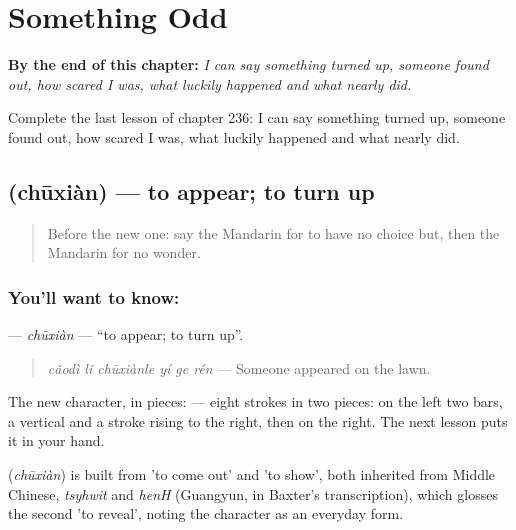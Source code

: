 
\chapter{Something Odd}
\label{ch:zh-something-odd}

\begin{chapteropening}
\textbf{By the end of this chapter:} \emph{I can say something turned up, someone found out, how scared I was, what luckily happened and what nearly did.}

Complete the last lesson of chapter 236: I can say something turned up, someone found out, how scared I was, what luckily happened and what nearly did.
\end{chapteropening}

\section[\texorpdfstring{\zh{出现} (chūxiàn)}{出现 (chūxiàn)}]{ (chūxiàn) — to appear; to turn up}

\label{lesson:ZH-C236-chuxian}



\begin{quote}
Before the new one: say the Mandarin for to have no choice but, then the Mandarin for no wonder.
\end{quote}

\subsection*{You'll want to know: }
\textbf{} — \emph{chūxiàn} — \textquotedblleft{}to appear; to turn up\textquotedblright{}.

\begin{quote}
\textbf{} \emph{cǎodì lǐ chūxiànle yí ge rén} — Someone appeared on the lawn.
\end{quote}

The new character, in pieces:  — eight strokes in two pieces: on the left two bars, a vertical and a stroke rising to the right, then  on the right. The next lesson puts it in your hand.

\begin{cousinweb}
\textbf{} (\emph{chūxiàn}) is built from  'to come out' and  'to show', both inherited from Middle Chinese, \emph{tsyhwit} and \emph{henH} (Guangyun, in Baxter's transcription), which glosses the second 'to reveal', noting the character as an everyday form.
\end{cousinweb}

